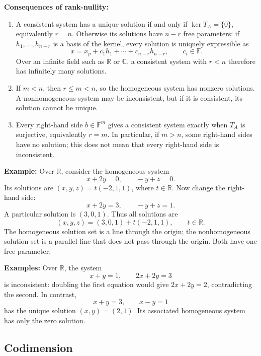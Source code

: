 \documentclass[a4paper,11pt,abstract=true]{scrartcl}
\theoremstyle{dotlessP}
\theoremstyle{dotlessS}
\theoremstyle{remark}
\theoremstyle{definition}
\begin{document}
\begin{claim_box}
\textbf{Consequences of rank-nullity:}
\begin{enumerate}
    \item A consistent system has a unique solution if and only if
    $\ker T_A=\{0\}$, equivalently $r=n$. Otherwise its solutions have
    $n-r$ free parameters: if $h_1,\ldots,h_{n-r}$ is a basis of the
    kernel, every solution is uniquely expressible as
    \[
    x=x_p+c_1 h_1+\cdots+c_{n-r}h_{n-r},\qquad c_i\in\mathbb{F}.
    \]
    Over an infinite field such as $\mathbb{R}$ or $\mathbb{C}$, a
    consistent system with $r<n$ therefore has infinitely many solutions.
    \item If $m<n$, then $r\leq m<n$, so the homogeneous system has
    nonzero solutions. A nonhomogeneous system may be inconsistent,
    but if it is consistent, its solution cannot be unique.
    \item Every right-hand side $b\in\mathbb{F}^m$ gives a consistent
    system exactly when $T_A$ is surjective, equivalently $r=m$.
    In particular, if $m>n$, some right-hand sides have no solution;
    this does not mean that every right-hand side is inconsistent.
\end{enumerate}
\end{claim_box}

\begin{example_box}
\textbf{Example:} Over $\mathbb{R}$,
consider the homogeneous system
\[
x+2y=0,\qquad -y+z=0.
\]
Its solutions are $(x,y,z)=t(-2,1,1)$, where $t\in\mathbb{R}$.
Now change the right-hand side:
\[
x+2y=3,\qquad -y+z=1.
\]
A particular solution is $(3,0,1)$. Thus all solutions are
\[
(x,y,z)=(3,0,1)+t(-2,1,1),\qquad t\in\mathbb{R}.
\]
The homogeneous solution set is a line through the origin; the
nonhomogeneous solution set is a parallel line that does not pass
through the origin. Both have one free parameter.
\end{example_box}

\begin{example_box}
\textbf{Examples:} Over
$\mathbb{R}$, the system
\[
x+y=1,\qquad 2x+2y=3
\]
is inconsistent: doubling the first equation would give $2x+2y=2$,
contradicting the second. In contrast,
\[
x+y=3,\qquad x-y=1
\]
has the unique solution $(x,y)=(2,1)$. Its associated homogeneous system
has only the zero solution.
\end{example_box}

\subsection{Codimension}
\end{document}
